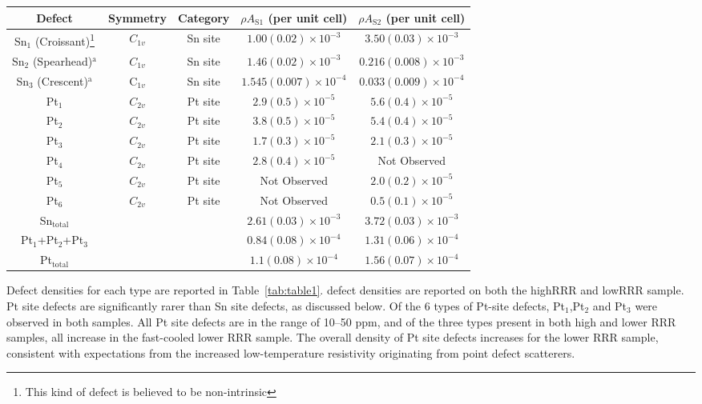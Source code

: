 \begin{table*}
		\renewcommand{\arraystretch}{1.5}  %
		\caption{Defect statistics of two samples of PtSn$_4$ grown at two different cooling rates: slow-cooled sample S1 (\ac{RRR}~$>1000$) and fast-cooled sample S2 (\ac{RRR}~$=200$).} \label{tab:table1}
		\begin{tabular}{ccccc}
			Defect & Symmetry & Category & $\rho A_{\text{S1}}$ (per unit cell) & $\rho A_{\text{S2}}$ (per unit cell) \\ 
			\hline
			Sn$_1$ (Croissant)\footnote{This kind of defect is believed to be non-intrinsic} & $C_{1v}$ & Sn site & $1.00(0.02) \times 10^{-3}$ & $3.50(0.03) \times 10^{-3}$ \\
			Sn$_2$ (Spearhead)$^{\text{a}}$ & $C_{1v}$ & Sn site & $1.46(0.02) \times 10^{-3}$ & $0.216(0.008) \times 10^{-3}$ \\
			Sn$_3$ (Crescent)$^{\text{a}}$ & C$_{1v}$ & Sn site & $1.545(0.007) \times 10^{-4}$ & $0.033(0.009) \times 10^{-4}$ \\
			\hline
			Pt$_1$ & $C_{2v}$ & Pt site & $2.9(0.5) \times 10^{-5}$ & $5.6(0.4) \times 10^{-5}$ \\
			Pt$_2$ & $C_{2v}$ & Pt site & $3.8(0.5) \times 10^{-5}$ & $5.4(0.4) \times 10^{-5}$ \\
			Pt$_3$ & $C_{2v}$ & Pt site & $1.7(0.3) \times 10^{-5}$ & $2.1(0.3) \times 10^{-5}$ \\
			Pt$_4$ & $C_{2v}$ & Pt site & $2.8(0.4) \times 10^{-5}$ & Not Observed \\
			Pt$_5$ & $C_{2v}$ & Pt site & Not Observed & $2.0(0.2) \times 10^{-5}$ \\
			Pt$_6$ & $C_{2v}$ & Pt site & Not Observed & $0.5(0.1) \times 10^{-5}$ \\
			\hline
			Sn$_{\text{total}}$ &  &  & $2.61(0.03) \times 10^{-3}$ & $3.72(0.03) \times 10^{-3}$ \\
			Pt$_1$+Pt$_2$+Pt$_3$ &  &  & $0.84(0.08) \times 10^{-4}$ & $1.31(0.06) \times 10^{-4}$ \\
			Pt$_{\text{total}}$ &  &  & $1.1(0.08) \times 10^{-4}$ & $1.56(0.07) \times 10^{-4}$ \\
		\end{tabular}
\end{table*}

\par Defect densities for each type are reported in Table~\ref{tab:table1}. defect densities are reported on both the highRRR and lowRRR sample. Pt site defects are significantly rarer than Sn site defects, as discussed below. Of the 6 types of Pt-site defects, Pt$_{1}$,Pt$_{2}$ and Pt$_{3}$ were observed in both samples. All Pt site defects are in the range of 10--50 ppm, and of the three types present in both high and lower RRR samples, all increase in the fast-cooled lower RRR sample. The overall density of Pt site defects increases for the lower RRR sample, consistent with expectations from the increased low-temperature resistivity originating from point defect scatterers.

